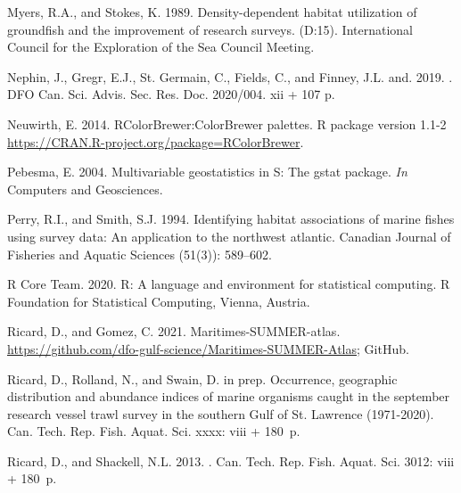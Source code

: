 \documentclass[12pt]{article}\usepackage[]{graphicx}\usepackage[]{color}
\begin{document}
\begin{CSLReferences}{1}{0}
\leavevmode\hypertarget{ref-Myers:Stokes:1989}{}%
Myers, R.A., and Stokes, K. 1989. Density-dependent habitat utilization of groundfish and the improvement of research surveys. (D:15). International Council for the Exploration of the Sea Council Meeting.

\leavevmode\hypertarget{ref-Nephin:2019}{}%
Nephin, J., Gregr, E.J., St. Germain, C., Fields, C., and Finney, J.L. and. 2019. . DFO Can. Sci. Advis. Sec. Res. Doc. 2020/004. xii + 107 p.

\leavevmode\hypertarget{ref-R:package:RColorBrewer}{}%
Neuwirth, E. 2014. RColorBrewer:ColorBrewer palettes. R package version 1.1-2 \url{https://CRAN.R-project.org/package=RColorBrewer}.

\leavevmode\hypertarget{ref-R:package:gstat}{}%
Pebesma, E. 2004. Multivariable geostatistics in {S}: The gstat package. \emph{In} Computers and Geosciences.

\leavevmode\hypertarget{ref-Perry:Smith:1994:cjfas}{}%
Perry, R.I., and Smith, S.J. 1994. Identifying habitat associations of marine fishes using survey data: An application to the northwest atlantic. Canadian Journal of Fisheries and Aquatic Sciences (51(3)): 589--602.

\leavevmode\hypertarget{ref-R:2020}{}%
R Core Team. 2020. R: A language and environment for statistical computing. R Foundation for Statistical Computing, Vienna, Austria.

\leavevmode\hypertarget{ref-Ricard-Gomez-2021}{}%
Ricard, D., and Gomez, C. 2021. Maritimes-SUMMER-atlas. \url{https://github.com/dfo-gulf-science/Maritimes-SUMMER-Atlas}; GitHub.

\leavevmode\hypertarget{ref-Ricard:GULFatlas:2021}{}%
Ricard, D., Rolland, N., and Swain, D. in prep. Occurrence, geographic distribution and abundance indices of marine organisms caught in the september research vessel trawl survey in the southern {G}ulf of {S}t. {L}awrence (1971-2020). Can. Tech. Rep. Fish. Aquat. Sci. xxxx: viii + 180~p.

\leavevmode\hypertarget{ref-Ricard:MARatlas:2013}{}%
Ricard, D., and Shackell, N.L. 2013. . Can. Tech. Rep. Fish. Aquat. Sci. 3012: viii + 180~p.


\end{CSLReferences}
\end{document}
